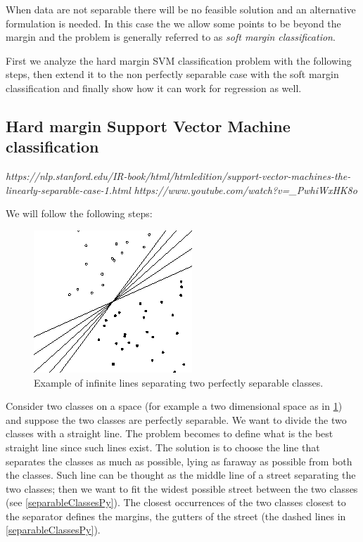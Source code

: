 \documentclass[12pt, letterpaper]{article}
\theoremstyle{definition}
\let\ti\textit
\begin{document}
When data are not separable there will be no feasible solution and an alternative formulation is needed. In this case the we allow some points to be beyond the margin and the problem is generally referred to as \ti{soft margin classification}.

First we analyze the hard margin SVM classification problem with the following steps, then extend it to the non perfectly separable case with the soft margin classification and finally show how it can work for regression as well.

\subsection{Hard margin Support Vector Machine classification}
\label{HardMarginSVM}
\textit{https://nlp.stanford.edu/IR-book/html/htmledition/support-vector-machines-the-linearly-separable-case-1.html}
\textit{https://www.youtube.com/watch?v=\_PwhiWxHK8o}

We will follow the following steps:

\begin{figure}
\centering
\includegraphics[scale=0.6]{img/separableClasses}
\caption{Example of infinite lines separating two perfectly separable classes.}
\label{separableClasses}
\end{figure}

Consider two classes on a space (for example a two dimensional space as in \ref{separableClasses}) and suppose the two classes are perfectly separable. We want to divide the two classes with a straight line. The problem becomes to define what is the best straight line since such lines exist. The solution is to choose the line that separates the classes as much as possible, lying as faraway as possible from both the classes. Such line can be thought as the middle line of a street separating the two classes; then we want to fit the widest possible street between the two classes (see \ref{separableClassesPy}). The closest occurrences of the two classes closest to the separator defines the margins, the gutters of the street (the dashed lines in \ref{separableClassesPy}).
\end{document}
